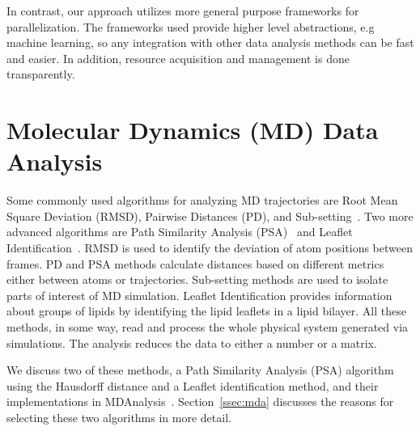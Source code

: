 In contrast, our approach utilizes more general purpose frameworks for parallelization.
The frameworks used provide higher level abstractions, e.g machine learning, so any  integration with other data analysis methods can be fast and easier.
In addition, resource acquisition and management is done transparently.

\section{Molecular Dynamics (MD) Data Analysis}
\label{sec:md_use_cases}
Some commonly used algorithms for analyzing MD trajectories are Root Mean Square Deviation (RMSD), Pairwise Distances (PD), and Sub-setting~\cite{mura2014biomolecules}.
Two more advanced algorithms are Path Similarity Analysis (PSA)~\cite{seyler2015path} and Leaflet Identification~\cite{michaud2011mdanalysis}.
RMSD is used to identify the deviation of atom positions between frames.
PD and PSA methods calculate distances based on different metrics either between atoms or trajectories.
Sub-setting methods are used to isolate parts of interest of MD simulation.
Leaflet Identification provides information about groups of lipids by identifying the lipid leaflets in a lipid bilayer.
All these methods, in some way, read and process the whole physical system generated via simulations.
The analysis reduces the data to either a number or a matrix.

We discuss two of these methods, a Path Similarity Analysis (PSA) algorithm using the Hausdorff distance and a Leaflet identification method, and their implementations in MDAnalysis~\cite{michaud2011mdanalysis,gowers2016mdanalysis}.
Section~\ref{ssec:mda} discusses the reasons for selecting these two algorithms in more detail.




